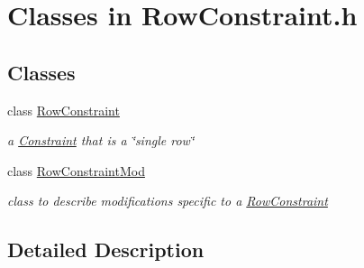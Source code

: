 \hypertarget{group___row_constraint___c_l_a_s_s_e_s}{}\section{Classes in Row\+Constraint.\+h}
\label{group___row_constraint___c_l_a_s_s_e_s}
\subsection*{Classes}
\begin{DoxyCompactItemize}
\item 
class \mbox{\hyperlink{class_s_m_spp__di__unipi__it_1_1_row_constraint}{Row\+Constraint}}
\begin{DoxyCompactList}\small\item\em a \mbox{\hyperlink{class_s_m_spp__di__unipi__it_1_1_constraint}{Constraint}} that is a \char`\"{}single row\char`\"{} \end{DoxyCompactList}\item 
class \mbox{\hyperlink{class_s_m_spp__di__unipi__it_1_1_row_constraint_mod}{Row\+Constraint\+Mod}}
\begin{DoxyCompactList}\small\item\em class to describe modifications specific to a \mbox{\hyperlink{class_s_m_spp__di__unipi__it_1_1_row_constraint}{Row\+Constraint}} \end{DoxyCompactList}\end{DoxyCompactItemize}


\subsection{Detailed Description}
